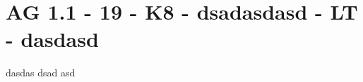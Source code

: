 \section{AG 1.1 - 19 - K8 - dsadasdasd - LT - dasdasd}

\begin{beispiel}[AG 1.1]{1}
dasdas dsad asd 
\end{beispiel}